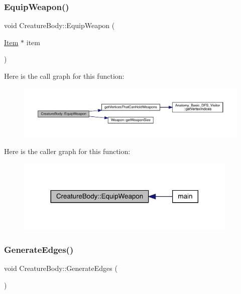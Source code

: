 \subsubsection{\texorpdfstring{Equip\+Weapon()}{EquipWeapon()}}
{\footnotesize\ttfamily void Creature\+Body\+::\+Equip\+Weapon (\begin{DoxyParamCaption}\item[{\mbox{\hyperlink{class_item}{Item}} $\ast$}]{item }\end{DoxyParamCaption})}

Here is the call graph for this function\+:
\nopagebreak
\begin{figure}[H]
\begin{center}
\leavevmode
\includegraphics[width=350pt]{da/d7d/class_creature_body_af329b825db569100370683f7a9b0263c_cgraph}
\end{center}
\end{figure}
Here is the caller graph for this function\+:
\nopagebreak
\begin{figure}[H]
\begin{center}
\leavevmode
\includegraphics[width=300pt]{da/d7d/class_creature_body_af329b825db569100370683f7a9b0263c_icgraph}
\end{center}
\end{figure}
\mbox{\label{class_creature_body_a8feda2cfc35e1b76730a31eb368ffed6}} 
\subsubsection{\texorpdfstring{Generate\+Edges()}{GenerateEdges()}}
{\footnotesize\ttfamily void Creature\+Body\+::\+Generate\+Edges (\begin{DoxyParamCaption}{ }\end{DoxyParamCaption})}

